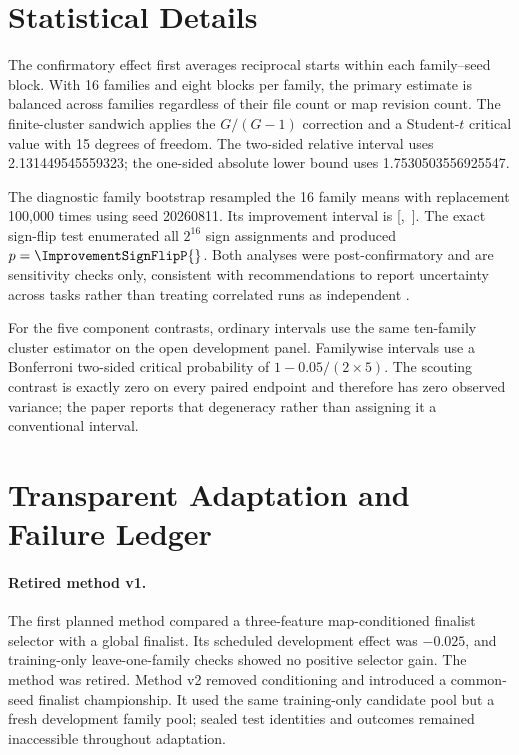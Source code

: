 \section{Statistical Details}

The confirmatory effect first averages reciprocal starts within each
family--seed block. With 16 families and eight blocks per family, the primary
estimate is balanced across families regardless of their file count or map
revision count. The finite-cluster sandwich applies the $G/(G-1)$ correction
and a Student-$t$ critical value with 15 degrees of freedom. The two-sided
relative interval uses 2.131449545559323; the one-sided absolute lower bound
uses 1.7530503556925547.

The diagnostic family bootstrap resampled the 16 family means with replacement
100,000 times using seed 20260811. Its improvement interval is
[\ImprovementBootstrapLower{},~\ImprovementBootstrapUpper{}]. The exact
sign-flip test enumerated all $2^{16}$ sign assignments and produced
$p=\ImprovementSignFlipP{}$. Both analyses were post-confirmatory and are
sensitivity checks only, consistent with recommendations to report uncertainty
across tasks rather than treating correlated runs as independent
\cite{agarwal2021precipice}.

For the five component contrasts, ordinary intervals use the same ten-family
cluster estimator on the open development panel. Familywise intervals use a
Bonferroni two-sided critical probability of $1-0.05/(2\times5)$. The scouting
contrast is exactly zero on every paired endpoint and therefore has zero
observed variance; the paper reports that degeneracy rather than assigning it
a conventional interval.

\section{Transparent Adaptation and Failure Ledger}

\paragraph{Retired method v1.}
The first planned method compared a three-feature map-conditioned finalist
selector with a global finalist. Its scheduled development effect was
$-0.025$, and training-only leave-one-family checks showed no positive selector
gain. The method was retired. Method v2 removed conditioning and introduced a
common-seed finalist championship. It used the same training-only candidate
pool but a fresh development family pool; sealed test identities and outcomes
remained inaccessible throughout adaptation.

